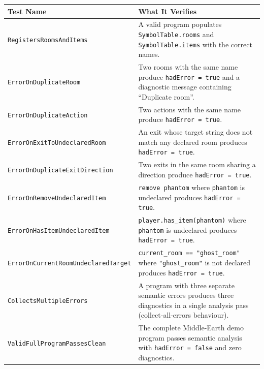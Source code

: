 \documentclass[12pt, a4paper]{article}
\begin{document}
\begin{longtable}{p{6.5cm} p{7cm}}
\toprule
\textbf{Test Name} & \textbf{What It Verifies} \\
\midrule
\endhead
\texttt{RegistersRoomsAndItems} &
  A valid program populates \texttt{SymbolTable.rooms} and
  \texttt{SymbolTable.items} with the correct names. \\[4pt]

\texttt{ErrorOnDuplicateRoom} &
  Two rooms with the same name produce \texttt{hadError = true} and a diagnostic
  message containing ``Duplicate room''. \\[4pt]

\texttt{ErrorOnDuplicateAction} &
  Two actions with the same name produce \texttt{hadError = true}. \\[4pt]

\texttt{ErrorOnExitToUndeclaredRoom} &
  An exit whose target string does not match any declared room produces
  \texttt{hadError = true}. \\[4pt]

\texttt{ErrorOnDuplicateExitDirection} &
  Two exits in the same room sharing a direction produce \texttt{hadError = true}. \\[4pt]

\texttt{ErrorOnRemoveUndeclaredItem} &
  \texttt{remove phantom} where \texttt{phantom} is undeclared produces
  \texttt{hadError = true}. \\[4pt]

\texttt{ErrorOnHasItemUndeclaredItem} &
  \texttt{player.has\_item(phantom)} where \texttt{phantom} is undeclared produces
  \texttt{hadError = true}. \\[4pt]

\texttt{ErrorOnCurrentRoomUndeclaredTarget} &
  \texttt{current\_room == "ghost\_room"} where \texttt{"ghost\_room"} is not declared
  produces \texttt{hadError = true}. \\[4pt]

\texttt{CollectsMultipleErrors} &
  A program with three separate semantic errors produces three diagnostics in a single
  analysis pass (collect-all-errors behaviour). \\[4pt]

\texttt{ValidFullProgramPassesClean} &
  The complete Middle-Earth demo program passes semantic analysis with
  \texttt{hadError = false} and zero diagnostics. \\
\bottomrule
\end{longtable}

\end{document}
